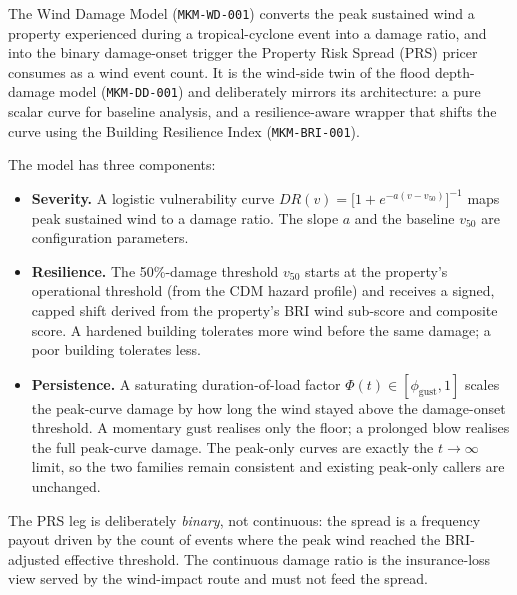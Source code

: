 \documentclass[11pt,a4paper]{article}
\begin{document}
\mkmtitlepage
\mkmlegalpage
\tableofcontents
\clearpage

\mkmexecsummary

The Wind Damage Model (\texttt{MKM-WD-001}) converts the peak sustained wind a
property experienced during a tropical-cyclone event into a damage ratio, and
into the binary damage-onset trigger the Property Risk Spread (PRS) pricer
consumes as a wind event count. It is the wind-side twin of the flood
depth-damage model (\texttt{MKM-DD-001}) and deliberately mirrors its
architecture: a pure scalar curve for baseline analysis, and a resilience-aware
wrapper that shifts the curve using the Building Resilience Index
(\texttt{MKM-BRI-001}).

The model has three components:

\begin{itemize}
  \item \textbf{Severity.} A logistic vulnerability curve
        $DR(v) = \bigl[1 + e^{-a(v - v_{50})}\bigr]^{-1}$ maps peak sustained
        wind to a damage ratio. The slope $a$ and the baseline $v_{50}$ are
        configuration parameters.
  \item \textbf{Resilience.} The 50\%-damage threshold $v_{50}$ starts at the
        property's operational threshold (from the CDM hazard profile) and
        receives a signed, capped shift derived from the property's BRI wind
        sub-score and composite score. A hardened building tolerates more wind
        before the same damage; a poor building tolerates less.
  \item \textbf{Persistence.} A saturating duration-of-load factor
        $\Phi(t) \in [\phi_{\text{gust}}, 1]$ scales the peak-curve damage by how
        long the wind stayed above the damage-onset threshold. A momentary gust
        realises only the floor; a prolonged blow realises the full peak-curve
        damage. The peak-only curves are exactly the $t \to \infty$ limit, so the
        two families remain consistent and existing peak-only callers are
        unchanged.
\end{itemize}

The PRS leg is deliberately \emph{binary}, not continuous: the spread is a
frequency payout driven by the count of events where the peak wind reached the
BRI-adjusted effective threshold. The continuous damage ratio is the
insurance-loss view served by the wind-impact route and must not feed the
spread.
\end{document}
